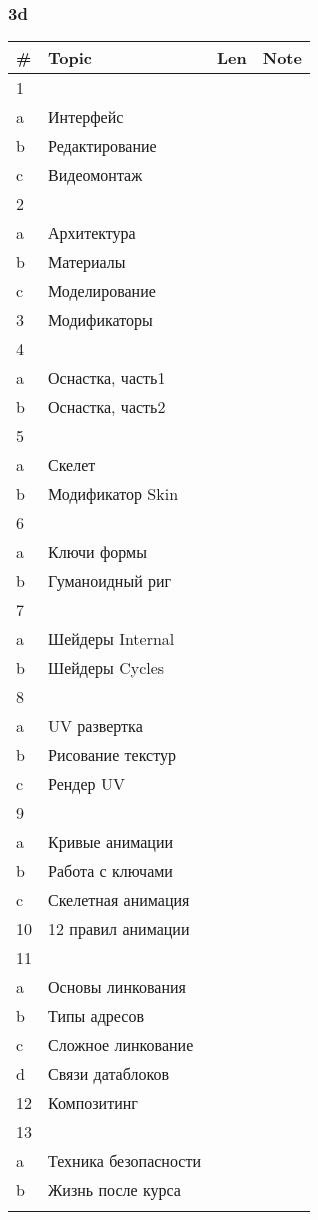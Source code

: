\documentclass[a4paper,12pt]{article} %
\begin{document}
\subsubsection{3d}
\begin{longtable}{|l|p{11cm}|l|l|}
	\hline
	\# & Topic & Len & Note \\
	\hline
	1 &  &  &  \\
	a & Интерфейс &  &  \\
	b & Редактирование &  &  \\
	c & Видеомонтаж &  &  \\
	\hline
	2 &  &  &  \\
	a & Архитектура &  &  \\
	b & Материалы &  &  \\
	c & Моделирование &  &  \\
	\hline
	3 & Модификаторы &  &  \\
	\hline
	4 &  &  &  \\
	a & Оснастка, часть1 &  &  \\
	b & Оснастка, часть2 &  &  \\
	\hline
	5 &  &  &  \\
	a & Скелет &  &  \\
	b & Модификатор Skin &  &  \\
	\hline
	6 &  &  &  \\
	a & Ключи формы &  &  \\
	b & Гуманоидный риг &  &  \\
	\hline
	7 &  &  &  \\
	a & Шейдеры Internal &  &  \\
	b & Шейдеры Cycles &  &  \\
	\hline
	8 &  &  &  \\
	a & UV развертка &  &  \\
	b & Рисование текстур &  &  \\
	c & Рендер UV &  &  \\
	\hline
	9 &  &  &  \\
	a & Кривые анимации &  &  \\
	b & Работа с ключами &  &  \\
	c & Скелетная анимация &  &  \\
	\hline
	10 & 12 правил анимации &  &  \\
	\hline
	11 &  &  &  \\
	a & Основы линкования &  &  \\
	b & Типы адресов &  &  \\
	c & Сложное линкование &  &  \\
	d & Связи датаблоков &  &  \\
	\hline
	12 & Композитинг &  &  \\
	\hline
	13 &  &  &  \\
	a & Техника безопасности &  &  \\
	b & Жизнь после курса &  &  \\
	\hline
	&  &  &  \\
	\hline
\end{longtable}
\end{document}
